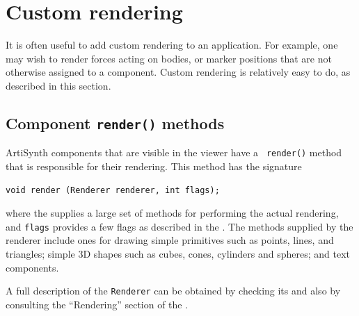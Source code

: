 \section{Custom rendering}

It is often useful to add custom rendering to an application.  For
example, one may wish to render forces acting on bodies, or marker
positions that are not otherwise assigned to a component.  Custom
rendering is relatively easy to do, as described in this section.

\subsection{Component {\tt render()} methods}
\label{RenderMethods:sec}

ArtiSynth components that are visible in the viewer have a {\tt
render()} method that is responsible for their rendering.  This method
has the signature
%
\begin{lstlisting}[]
  void render (Renderer renderer, int flags);
\end{lstlisting}
%
where the
supplies a large set of methods for performing the actual rendering,
and {\tt flags} provides a few flags as described in the
.
The methods supplied by the renderer include ones for drawing simple
primitives such as points, lines, and triangles; simple 3D shapes such
as cubes, cones, cylinders and spheres; and text components.

\begin{sideblock}
A full description of the {\tt Renderer} can be obtained
by checking its 
and also by consulting the ``Rendering'' section of the
.
\end{sideblock}

